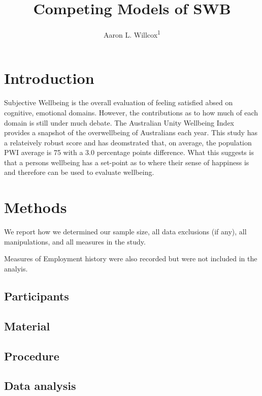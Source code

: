 \documentclass[man,floatsintext]{apa6}
\title{Competing Models of SWB}
\author{Aaron L. Willcox\textsuperscript{1}}
\date{}
\affiliation{
\vspace{0.5cm}
\textsuperscript{1} Deakin University}
\begin{document}
\maketitle

\section{Introduction}\label{introduction}

Subjective Wellbeing is the overall evaluation of feeling satisfied
absed on cognitive, emotional domains. However, the contributions as to
how much of each domain is still under much debate. The Australian Unity
Wellbeing Index provides a snapshot of the overwellbeing of Australians
each year. This study has a relateively robust score and has deomstrated
that, on average, the population PWI average is 75 with a 3.0 percentage
points difference. What this suggests is that a persons wellbeing has a
set-point as to where their sense of happiness is and therefore can be
used to evaluate wellbeing.

\section{Methods}\label{methods}

We report how we determined our sample size, all data exclusions (if
any), all manipulations, and all measures in the study.

Measures of Employment history were also recorded but were not included
in the analyis.

\subsection{Participants}\label{participants}

\subsection{Material}\label{material}

\subsection{Procedure}\label{procedure}

\subsection{Data analysis}\label{data-analysis}
\end{document}
